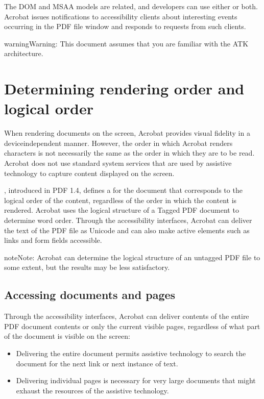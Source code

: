 \documentclass[letterpaper,12pt,english,openany,oneside]{sphinxmanual}
\begin{document}
The DOM and MSAA models are related, and developers can use either or both. Acrobat issues notifications to accessibility clients about interesting events occurring in the PDF file window and responds to requests from such clients.

\begin{sphinxadmonition}{warning}{Warning:}
This document assumes that you are familiar with the ATK architecture.
\end{sphinxadmonition}


\section{Determining rendering order and logical order}
\label{\detokenize{index:determining-rendering-order-and-logical-order}}
When rendering documents on the screen, Acrobat provides visual fidelity in a device\sphinxhyphen{}independent manner. However, the order in which Acrobat renders characters is not necessarily the same as the order in which they are to be read. Acrobat does not use standard system services that are used by assistive technology to capture content displayed on the screen.

 , introduced in PDF 1.4, defines a  for the document that corresponds to the logical order of the content, regardless of the order in which the content is rendered. Acrobat uses the logical structure of a Tagged PDF document to determine word order. Through the accessibility interfaces, Acrobat can deliver the text of the PDF file as Unicode and can also make active elements such as links and form fields accessible.

\begin{sphinxadmonition}{note}{Note:}
Acrobat can determine the logical structure of an untagged PDF file to some extent, but the results may be less satisfactory.
\end{sphinxadmonition}


\subsection{Accessing documents and pages}
\label{\detokenize{index:accessing-documents-and-pages}}
Through the accessibility interfaces, Acrobat can deliver contents of the entire PDF document contents or only the current visible pages, regardless of what part of the document is visible on the screen:
\begin{itemize}
\item {} 
Delivering the entire document permits assistive technology to search the document for the next link or next instance of text.

\item {} 
Delivering individual pages is necessary for very large documents that might exhaust the resources of the assistive technology.

\end{itemize}
\end{document}

